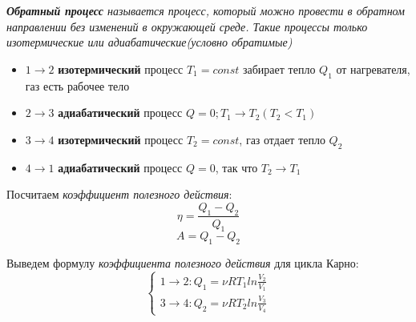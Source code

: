 \documentclass[../main.tex]{subfiles}
\begin{document}
\begin{center}
\end{center}
 \textit{\textbf{Обратный процесс} называется процесс, который можно провести в обратном направлении без изменений в окружающей среде. Такие процессы только изотермические или адиабатические(условно обратимые)}
\begin{itemize}
    \item $1 \to 2$ \textbf{изотермический} процесс $T_1 = const$ забирает тепло $Q_1$ от нагревателя, газ есть рабочее тело
    \item $2 \to 3$ \textbf{адиабатический} процесс $ Q = 0 ; T_1 \to T_2(T_2 < T_1)$
    \item $3 \to 4$ \textbf{изотермический} процесс $T_2 = const$, газ отдает тепло $Q_2$
    \item $4 \to 1$ \textbf{адиабатический} процесс $Q = 0$, так что $T_2 \to T_1$
\end{itemize}
Посчитаем \textit{коэффициент полезного действия}:
\[ \eta = \frac{Q_1 - Q_2}{Q_1}\]
\[A = Q_1 - Q_2 \]

Выведем формулу \textit{коэффициента полезного действия} для цикла Карно:
\begin{equation*}
    \begin{cases}
        1 \to 2: Q_1 = \nu RT_1 ln{\frac{V_2}{V_1}}
        \\
        3 \to 4: Q_2 = \nu RT_2 ln{\frac{V_3}{V_4}}
    \end{cases}
\end{equation*}
\end{document}
